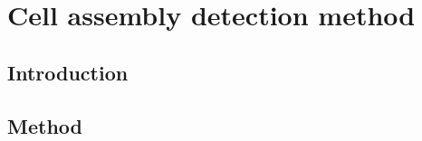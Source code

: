 \chapter{Cell assembly detection method}
\label{chap:AssemblyMethod}
\section{Introduction}
\section{Method}
